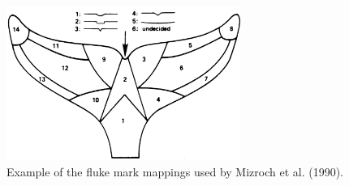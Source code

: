 \documentclass[11pt]{article}
\begin{document}
\begin{figure}
  \begin{flushright}
    \includegraphics[width=3in]{FlukeMap.png}
  \end{flushright}
  \caption{Example of the fluke mark mappings used by Mizroch et al. (1990).}
\end{figure}
\end{document}
